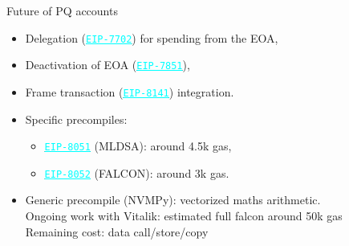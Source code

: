 \documentclass[aspectratio=1610]{beamer}
\newcommand{\link}[2]{\href{#1}{\textcolor{cyan}{\underline{\texttt{#2}}}}}
\newcommand{\eiplink}[1]{\link{https://eips.ethereum.org/EIPS/eip-#1}{EIP-#1}}
\begin{document}
\begin{frame}{Future of PQ accounts}
\begin{itemize}
      \item[\faSquareO] Delegation (\eiplink{7702}) for spending from the EOA,
      \item[\faClockO] Deactivation of EOA (\eiplink{7851}),
      \item[\faClockO] Frame transaction (\eiplink{8141}) integration.
      \item[\faClockO] Specific precompiles:
      \begin{itemize}
        \item \eiplink{8051} (MLDSA): around 4.5k gas,
        \item \eiplink{8052} (FALCON): around 3k gas.
      \end{itemize}
      \item[\faClockO] Generic precompile (NVMPy): vectorized maths arithmetic.\\
      Ongoing work with Vitalik: estimated full falcon around 50k gas\\ 
      Remaining cost: data call/store/copy \faWarning
    \end{itemize}
\end{frame}
\end{document}

